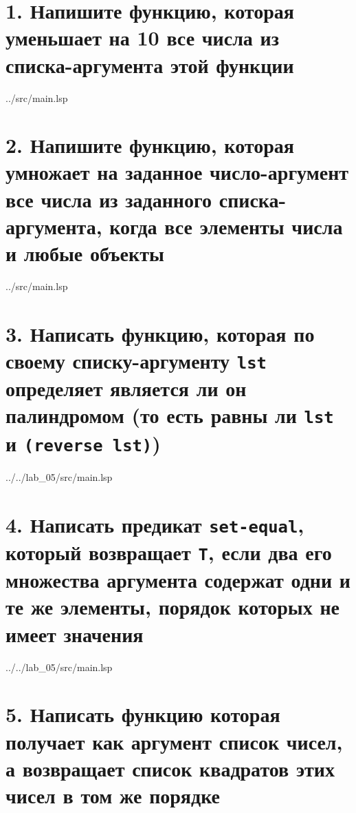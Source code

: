 \section*{1. Напишите функцию, которая уменьшает на 10 все числа из списка-аргумента этой функции}

\begin{lstinputlisting}[
	caption={Задание 1},
	label={lst:t1},
	style={lsp},
	linerange={1-2},
	]{../src/main.lsp}
\end{lstinputlisting}

\section*{2. Напишите функцию, которая умножает на заданное число-аргумент все числа из заданного списка-аргумента, когда все элементы числа и любые объекты}

\begin{lstinputlisting}[
	caption={Задание 2},
	label={lst:t2},
	style={lsp},
	linerange={4-12},
	]{../src/main.lsp}
\end{lstinputlisting}

\section*{3. Написать функцию, которая по своему списку-аргументу \texttt{lst} определяет является ли он палиндромом (то есть равны ли \texttt{lst} и \texttt{(reverse lst)})}


\begin{lstinputlisting}[
	caption={Задание 3},
	label={lst:t3},
	style={lsp},
	linerange={1-2},
	]{../../lab\_05/src/main.lsp}
\end{lstinputlisting}

\section*{4. Написать предикат \texttt{set-equal}, который возвращает \texttt{T}, если два его множества аргумента содержат одни и те же элементы, порядок которых не имеет значения}

\begin{lstinputlisting}[
	caption={Задание 4},
	label={lst:t4},
	style={lsp},
	linerange={4-5},
	]{../../lab\_05/src/main.lsp}
\end{lstinputlisting}

\section*{5. Написать функцию которая получает как аргумент список чисел, а возвращает список квадратов этих чисел в том же порядке}

